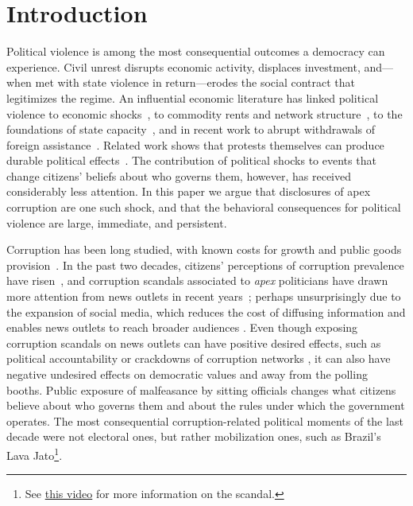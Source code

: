 \documentclass[11pt]{article}
\begin{document}
\section{Introduction}

Political violence is among the most consequential outcomes a democracy can experience. Civil unrest disrupts economic activity, displaces investment, and---when met with state violence in return---erodes the social contract that legitimizes the regime. An influential economic literature has linked political violence to economic shocks~\citep{miguel2004economic,mcguirk2020economic}, to commodity rents and network structure~\citep{koenig2017networks,dube2013commodity}, to the foundations of state capacity~\citep{besley2011logic}, and in recent work to abrupt withdrawals of foreign assistance~\citep{rohner2026aidingpeace}. Related work shows that protests themselves can produce durable political effects~\citep{madestam2013protests,bursztyn2021persistent}. The contribution of political shocks to events that change citizens' beliefs about who governs them, however, has received considerably less attention. In this paper we argue that disclosures of apex corruption are one such shock, and that the behavioral consequences for political violence are large, immediate, and persistent.

Corruption has been long studied, with known costs for growth and public goods provision~\citep{mauro1995corruption,treisman2007what,olken2007monitoring,olken2012corruption,glaeser2006corruption}. In the past two decades, citizens' perceptions of corruption prevalence have risen~\citep{cantoni2024protests}, and corruption scandals associated to \textit{apex} politicians have drawn more attention from news outlets in recent years~\citep{ApexCorruption}; perhaps unsurprisingly due to the expansion of social media, which reduces the cost of diffusing information and enables news outlets to reach broader audiences \citep{dellavigna2007fox,enikolopov2018SocialMedia, tufekci2024twitter}. Even though exposing corruption scandals on news outlets can have positive desired effects, such as political accountability or crackdowns of corruption networks \citep{ferraz2011electoral, horacio2019infonetwork, horacio2022metaketa}, it can also have negative undesired effects on democratic values \citep{ajzenman2021powerexample, ApexCorruption} and away from the polling booths. Public exposure of malfeasance by sitting officials changes what citizens believe about who governs them and about the rules under which the government operates. The most consequential corruption-related political moments of the last decade were not electoral ones, but rather mobilization ones, such as Brazil's Lava Jato\footnote{See \href{https://www.youtube.com/watch?v=boK0Mh2T5nk}{this video} for more information on the scandal.}.
\end{document}
